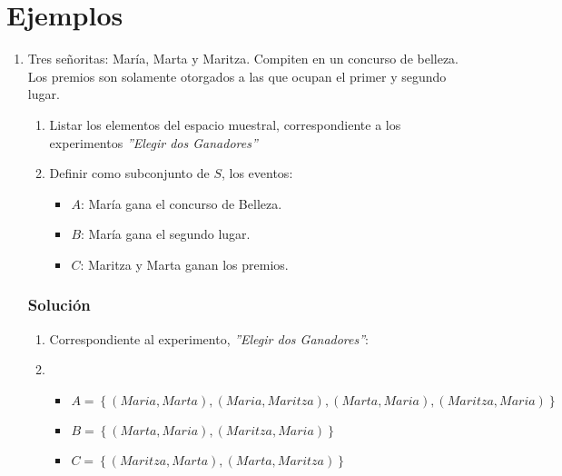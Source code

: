 \section{Ejemplos}
\begin{enumerate}
\item Tres señoritas: María, Marta y Maritza. Compiten en un concurso de belleza. Los premios son solamente otorgados a las que ocupan el primer y segundo lugar.
\begin{enumerate}
\item Listar los elementos del espacio muestral, correspondiente a los experimentos \textit{''Elegir dos Ganadores''}
\item Definir como subconjunto de $S$, los eventos:
\begin{itemize}
\item $A$: María gana el concurso de Belleza.
\item $B$: María gana el segundo lugar.
\item $C$: Maritza y Marta ganan los premios.
\end{itemize}
\end{enumerate}
\subsubsection{Solución}
\begin{enumerate}
\item Correspondiente al experimento, \textit{''Elegir dos Ganadores''}:
\item
\begin{itemize}
\item $A=\left\lbrace (Maria,Marta),(Maria,Maritza),(Marta,Maria),(Maritza,Maria)\right\rbrace $
\item $B=\left\lbrace (Marta,Maria),(Maritza,Maria)\right\rbrace$
\item $C=\left\lbrace (Maritza,Marta),(Marta,Maritza)\right\rbrace$
\end{itemize}
\end{enumerate}


\end{enumerate}